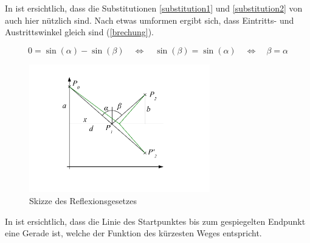 In  ist ersichtlich, dass die Substitutionen \ref{substitution1} und \ref{substitution2} von  auch hier nützlich sind.
Nach etwas umformen ergibt sich, dass Eintritts- und Austrittswinkel gleich sind (\eqref{brechung}).


\begin{equation}
0 = \sin(\alpha) - \sin(\beta) \quad \Leftrightarrow \quad \sin(\beta) = \sin(\alpha) \quad \Leftrightarrow\quad \beta = \alpha
\label{brechung}
\end{equation}

\begin{figure}[H]
\begin{center}
	\includegraphics[width=0.7\textwidth]{./picture/Spiegelung.pdf}
	\caption{Skizze des Reflexionsgesetzes}
	\label{Ab:spiegelung}
\end{center}
\end{figure}


In  ist ersichtlich, dass die Linie des Startpunktes bis zum 
gespiegelten Endpunkt eine Gerade ist, welche der Funktion des kürzesten Weges entspricht.
